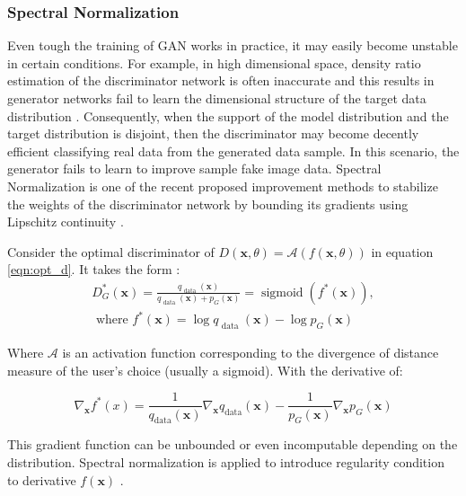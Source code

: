 \subsubsection{Spectral Normalization}
\label{sec:alad_sn}

Even tough the training of GAN works in practice, it may easily become unstable in certain
conditions. For example, in high dimensional space, density ratio estimation of the discriminator
network is often inaccurate and this results in generator networks fail to learn the dimensional
structure of the target data distribution \cite{methods}. Consequently, when the support of the model
distribution and the target distribution is disjoint, then the discriminator may become decently
efficient classifying real data from the generated data sample. In this scenario, the generator
fails to learn to improve sample fake image data. Spectral Normalization is one of the recent
proposed improvement methods to stabilize the weights of the discriminator network by bounding its
gradients using Lipschitz continuity \cite{inproceedings_sn}. 

Consider the optimal discriminator of $D(\boldsymbol{x}, \theta)=\mathcal{A}(f(\boldsymbol{x}, \theta))$ in equation \ref{eqn:opt_d}. It takes the form :
\begin{multline}
    D_{G}^{*}(\boldsymbol{x})=\frac{q_{\text { data }}(\boldsymbol{x})}{q_{\text { data }}(\boldsymbol{x})+p_{G}(\boldsymbol{x})}=\operatorname{sigmoid}\left(f^{*}(\boldsymbol{x})\right), \\ \text { where } f^{*}(\boldsymbol{x})=\log q_{\text { data }}(\boldsymbol{x})-\log p_{G}(\boldsymbol{x}) 
\end{multline}

Where $\mathcal{A}$ is an activation function corresponding to the divergence of distance measure of the
user’s choice (usually a sigmoid). With the derivative of: 

\begin{equation}
    \nabla_{\boldsymbol{x}} f^{*}(x)=\frac{1}{q_{\mathrm{data}}(\boldsymbol{x})} \nabla_{\boldsymbol{x}} q_{\mathrm{data}}(\boldsymbol{x})-\frac{1}{p_{G}(\boldsymbol{x})} \nabla_{\boldsymbol{x}} p_{G}(\boldsymbol{x})  
\end{equation}

This gradient function can be unbounded or even incomputable depending on the distribution. Spectral
normalization is applied to introduce regularity condition to derivative $f(\boldsymbol{x})$
\cite{inproceedings_sn}.

